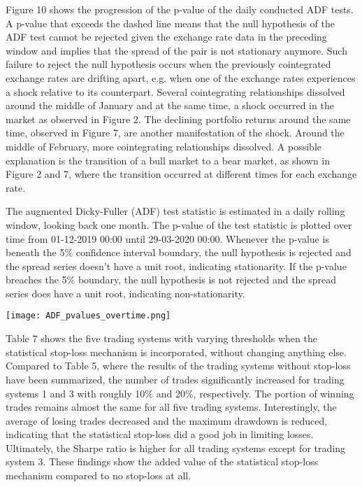 \documentclass[12pt,english,authoryear]{article}
\begin{document}
Figure 10 shows the progression of the p-value of the daily conducted ADF tests. A p-value that exceeds the dashed line means that the null hypothesis of the ADF test cannot be rejected given the exchange rate data in the preceding window and implies that the spread of the pair is not stationary anymore. Such failure to reject the null hypothesis occurs when the previously cointegrated exchange rates are drifting apart, e.g. when one of the exchange rates experiences a shock relative to its counterpart. Several cointegrating relationships dissolved around the middle of January and at the same time, a shock occurred in the market as observed in Figure 2. The declining portfolio returns around the same time, observed in Figure 7, are another manifestation of the shock. Around the middle of February, more cointegrating relationships dissolved. A possible explanation is the transition of a bull market to a bear market, as shown in Figure 2 and 7, where the transition occurred at different times for each exchange rate. 

\begin{center}
\begin{minipage}{\textwidth}
\caption*{\footnotesize The augmented Dicky-Fuller (ADF) test statistic is estimated in a daily rolling window, looking back one month. The p-value of the test statistic is plotted over time from 01-12-2019 00:00 until 29-03-2020 00:00. Whenever the p-value is beneath the 5\% confidence interval boundary, the null hypothesis is rejected and the spread series doesn't have a unit root, indicating stationarity. If the p-value breaches the 5\% boundary, the null hypothesis is not rejected and the spread series does have a unit root, indicating non-stationarity.}
\texttt{[image: ADF\_pvalues\_overtime.png]}
\end{minipage}
\end{center}

Table 7 shows the five trading systems with varying thresholds when the statistical stop-loss mechanism is incorporated, without changing anything else. Compared to Table 5, where the results of the trading systems without stop-loss have been summarized, the number of trades significantly increased for trading systems 1 and 3 with roughly 10\% and 20\%, respectively. The portion of winning trades remains almost the same for all five trading systems. Interestingly, the average of losing trades decreased and the maximum drawdown is reduced, indicating that the statistical stop-loss did a good job in limiting losses. Ultimately, the Sharpe ratio is higher for all trading systems except for trading system 3. These findings show the added value of the statistical stop-loss mechanism compared to no stop-loss at all.
\end{document}
